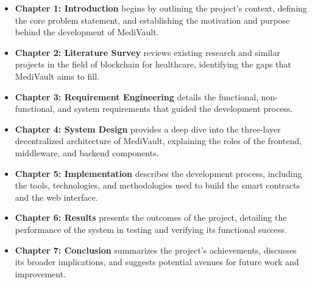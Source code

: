 \begin{itemize}
    \item \textbf{Chapter 1: Introduction} begins by outlining the project's context, defining the core problem statement, and establishing the motivation and purpose behind the development of MediVault.
    \item \textbf{Chapter 2: Literature Survey} reviews existing research and similar projects in the field of blockchain for healthcare, identifying the gaps that MediVault aims to fill.
    \item \textbf{Chapter 3: Requirement Engineering} details the functional, non-functional, and system requirements that guided the development process.
    \item \textbf{Chapter 4: System Design} provides a deep dive into the three-layer decentralized architecture of MediVault, explaining the roles of the frontend, middleware, and backend components.
    \item \textbf{Chapter 5: Implementation} describes the development process, including the tools, technologies, and methodologies used to build the smart contracts and the web interface.
    \item \textbf{Chapter 6: Results} presents the outcomes of the project, detailing the performance of the system in testing and verifying its functional success.
    \item \textbf{Chapter 7: Conclusion} summarizes the project's achievements, discusses its broader implications, and suggests potential avenues for future work and improvement.
\end{itemize}
